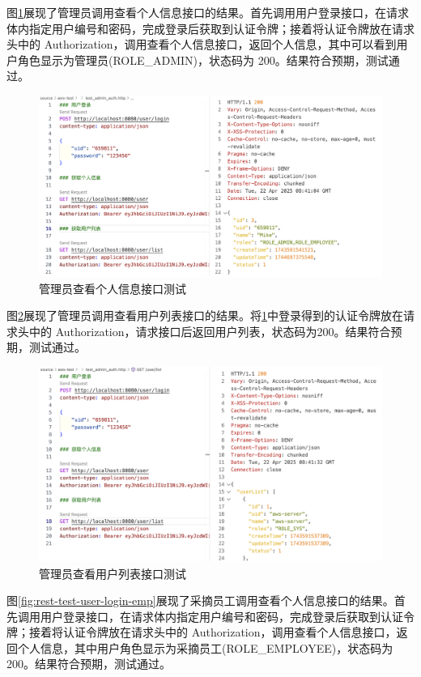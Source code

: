 图\ref{fig:rest-test-user-login-admin}展现了管理员调用查看个人信息接口的结果。首先调用用户登录接口，在请求体内指定用户编号和密码，完成登录后获取到认证令牌；接着将认证令牌放在请求头中的 Authorization，调用查看个人信息接口，返回个人信息，其中可以看到用户角色显示为管理员(ROLE\_ADMIN)，状态码为 200。结果符合预期，测试通过。

\begin{figure}[H]
    \centering
    \includegraphics[width=0.9\linewidth]{../result/rest-test-user-login-admin.png}
    \caption{管理员查看个人信息接口测试}
    \label{fig:rest-test-user-login-admin}
\end{figure}

图\ref{fig:rest-test-user-list-admin}展现了管理员调用查看用户列表接口的结果。将\ref{fig:rest-test-user-login-admin}中登录得到的认证令牌放在请求头中的 Authorization，请求接口后返回用户列表，状态码为200。结果符合预期，测试通过。

\begin{figure}[H]
    \centering
    \includegraphics[width=0.9\linewidth]{../result/rest-test-user-list-admin.png}
    \caption{管理员查看用户列表接口测试}
    \label{fig:rest-test-user-list-admin}
\end{figure}

图\ref{fig:rest-test-user-login-emp}展现了采摘员工调用查看个人信息接口的结果。首先调用用户登录接口，在请求体内指定用户编号和密码，完成登录后获取到认证令牌；接着将认证令牌放在请求头中的 Authorization，调用查看个人信息接口，返回个人信息，其中用户角色显示为采摘员工(ROLE\_EMPLOYEE)，状态码为 200。结果符合预期，测试通过。

